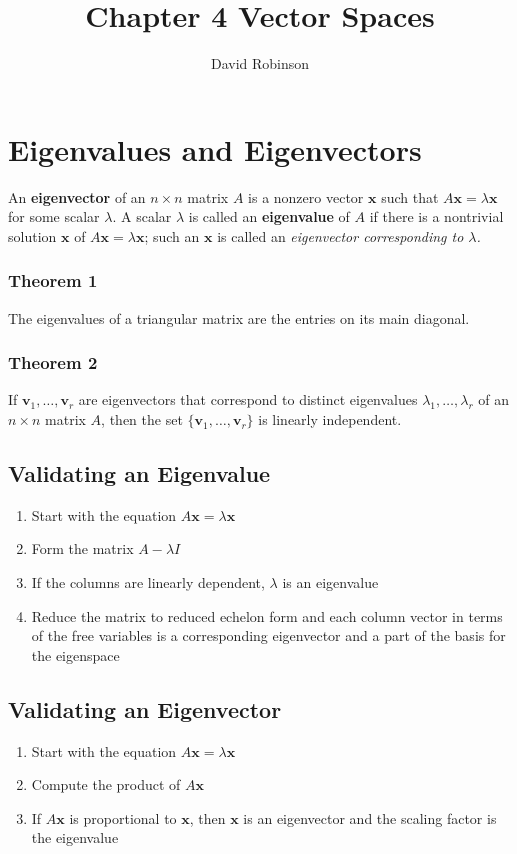 \documentclass{article}
\title{Chapter 4 Vector Spaces}
\author{David Robinson}
\date{}
\begin{document}
\maketitle

\section*{Eigenvalues and Eigenvectors}

An \textbf{eigenvector} of an $n\times n$ matrix $A$ is a nonzero vector $\mathbf{x}$ such that
$A\mathbf{x}=\lambda\mathbf{x}$ for some scalar $\lambda$. A scalar $\lambda$ is called an
\textbf{eigenvalue} of $A$ if there is a nontrivial solution $\mathbf{x}$ of
$A\mathbf{x}=\lambda\mathbf{x}$; such an $\mathbf{x}$ is called an
\textit{eigenvector corresponding to $\lambda$.}

\subsubsection*{Theorem 1}
The eigenvalues of a triangular matrix are the entries on its main diagonal.

\subsubsection*{Theorem 2}
If $\mathbf{v}_1, \ldots, \mathbf{v}_r$ are eigenvectors that correspond to distinct eigenvalues
$\lambda_1, \ldots, \lambda_r$ of an $n\times n$ matrix $A$, then the set
$\{\mathbf{v}_1, \ldots, \mathbf{v}_r\}$ is linearly independent.

\subsection*{Validating an Eigenvalue}
\begin{enumerate}
    \item Start with the equation $A\mathbf{x}=\lambda \mathbf{x}$
    \item Form the matrix $A-\lambda I$
    \item If the columns are linearly dependent, $\lambda$ is an eigenvalue
    \item Reduce the matrix to reduced echelon form and each column vector in terms of the free
    variables is a corresponding eigenvector and a part of the basis for the eigenspace
\end{enumerate}

\subsection*{Validating an Eigenvector}
\begin{enumerate}
    \item Start with the equation $A\mathbf{x}=\lambda\mathbf{x}$
    \item Compute the product of $A\mathbf{x}$
    \item If $A\mathbf{x}$ is proportional to $\mathbf{x}$, then $\mathbf{x}$ is an eigenvector and
    the scaling factor is the eigenvalue
\end{enumerate}
\end{document}
